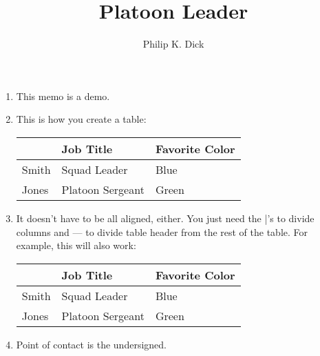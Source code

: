 \documentclass{/app/resources/latex/armymemo-notikz}
\author{Philip K. Dick}\rank{1LT}\branch{EN}
\title{Platoon Leader}
\begin{document}
\begin{enumerate}
\item This memo is a demo.
\item This is how you create a table:


\begin{center}
\begin{tabular}{|l|l|l|}
\hline
       & Job Title          & Favorite Color    \\
\hline
 Smith & Squad Leader       & Blue              \\\hline
 Jones & Platoon Sergeant   & Green             \\
\hline
\end{tabular}
\end{center}
\item It doesn't have to be all aligned, either. You just need the |'s to divide columns and --- to divide table header from the rest of the table. For example, this will also work:


\begin{center}
\begin{tabular}{|l|l|l|}
\hline
       & Job Title          & Favorite Color    \\
\hline
 Smith & Squad Leader       & Blue              \\\hline
 Jones & Platoon Sergeant   & Green             \\
\hline
\end{tabular}
\end{center}
\item Point of contact is the undersigned.
\end{enumerate}
\end{document}
